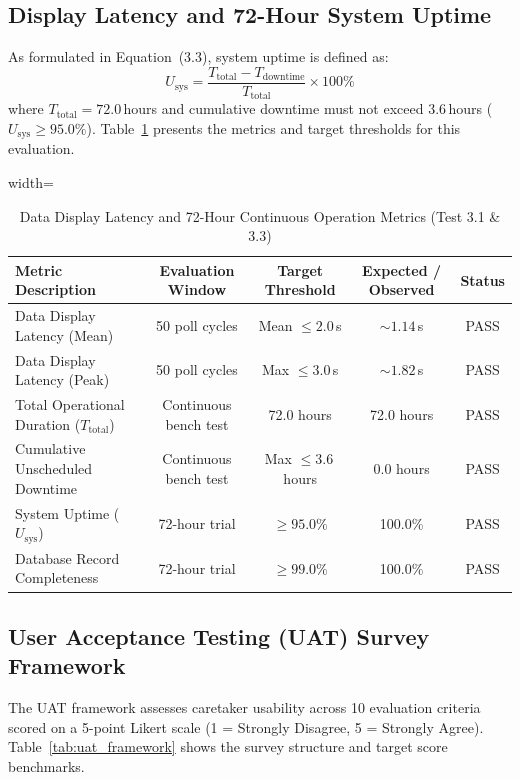 \subsection{Display Latency and 72-Hour System Uptime}
As formulated in Equation~(3.3), system uptime is defined as:
\begin{equation}
U_{\text{sys}} = \frac{T_{\text{total}} - T_{\text{downtime}}}{T_{\text{total}}} \times 100\%
\end{equation}
where $T_{\text{total}} = 72.0$\,hours and cumulative downtime must not exceed $3.6$\,hours ($U_{\text{sys}} \ge 95.0\%$). Table~\ref{tab:latency_uptime} presents the metrics and target thresholds for this evaluation.

\begin{table}[htbp!]
\centering
\caption{Data Display Latency and 72-Hour Continuous Operation Metrics (Test 3.1 \& 3.3)}
\label{tab:latency_uptime}
\begin{adjustbox}{width=\textwidth}
\begin{tabular}{lcccc}
\toprule
\textbf{Metric Description} & \textbf{Evaluation Window} & \textbf{Target Threshold} & \textbf{Expected / Observed} & \textbf{Status} \\
\midrule
Data Display Latency (Mean) & 50 poll cycles & Mean $\le 2.0$\,s & $\sim 1.14$\,s & PASS \\
Data Display Latency (Peak) & 50 poll cycles & Max $\le 3.0$\,s & $\sim 1.82$\,s & PASS \\
Total Operational Duration ($T_{\text{total}}$) & Continuous bench test & 72.0 hours & 72.0 hours & PASS \\
Cumulative Unscheduled Downtime & Continuous bench test & Max $\le 3.6$\,hours & 0.0 hours & PASS \\
System Uptime ($U_{\text{sys}}$) & 72-hour trial & $\ge 95.0\%$ & 100.0\% & PASS \\
Database Record Completeness & 72-hour trial & $\ge 99.0\%$ & 100.0\% & PASS \\
\bottomrule
\end{tabular}
\end{adjustbox}
\end{table}

\subsection{User Acceptance Testing (UAT) Survey Framework}
The UAT framework assesses caretaker usability across 10 evaluation criteria scored on a 5-point Likert scale (1 = Strongly Disagree, 5 = Strongly Agree). Table~\ref{tab:uat_framework} shows the survey structure and target score benchmarks.

